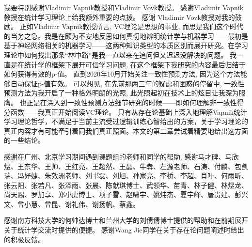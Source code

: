 我要特别感谢Vladimir Vapnik教授和Vladimir Vovk教授。 感谢Vladimir Vapnik教授在统计学习理论上给我额外重要的点拨。 感谢 Vladimir Vovk教授对我的鼓励。 正如Vladimir Vapnik教授所言, VC理论是思想的事业, 而思是我们这个时代的当务之急。我是在颇为不安地反思如何真切地辨明统计学与机器学习——最初是基于神经网络相关的机器学习——这两种知识类型的本质区别而展开研究。在学习理论中如何找出那条“林中路”是我一直以来在追问但又迟迟没解决的问题。 我一直是在统计学的框架下展开可信学习问题, 在这个框架下我研究的内容最后归结于如何获得有效的p-值。 直到2020年10月开始关注一致性预测方法, 因为这个方法能够自动保证p-值有效。 可以想见, 在先前那两三年的疑虑和困惑的停留中, 一致性预测方法为我开启了一种格外明朗的光照, 此光照起初在技术上的炫目让我深为服膺。 也正是在深入到一致性预测方法细节研究的时候——即如何理解非一致性得分函数——我真正开始阅读VC理论。 只有从存在论基础上深入地理解Vapnik统计学习理论哲学，不满足于当前主流受过逻辑训练心智给出的方案，关于学习理论的真正内容才有可能牵引着同我们真正照面。本文的第二章尝试着精要地给出这方面的一些结论。

感谢在广州、北京学习期间遇到课题组的老师和同学的帮助, 感谢马才碑、马欣煜、王东华、王帅、王红亮、王超然、王晶、牛犇、左源老师、石涛、付鹏、包凯瑞、冯妤婕、朱效洲老师、刘书磊、刘旭、孙家亮、李桥、李超、肖叶、何雨昕、张云阳、张若凡、张泽雨、张晨、陈献琪博士、武领华、苗青、林子健、林煜龙、尚天赐、罗加享、郑小虎博士、项子雪、赵啸宇、姚炜杰、夏宇峰、唐贵建、彭兴文、曾小慧、曾昆、谢礼伟、谢扬帆、蔡鑫。

感谢南方科技大学的何帅达博士和兰州大学的刘倩倩博士提供的帮助和在前期展开关于统计学交流时提供的便捷。 感谢Wang Jie同学在关于存在论问题阐述时给出的积极反馈。

